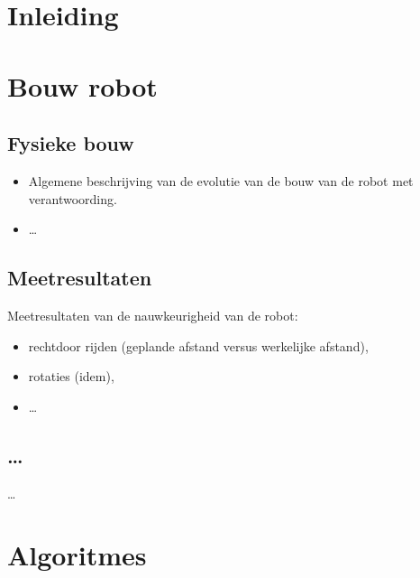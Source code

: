 \documentclass[tt1]{penoverslag}
\begin{document}

\maketitlepage

\begin{abstract}
\lipsum[1-2]
\end{abstract}

\tableofcontents

\newpage

\section{Inleiding}
\lipsum[1-2]

\section{Bouw robot}
\lipsum[3]

\subsection{Fysieke bouw}
\begin{itemize}
\item Algemene beschrijving van de evolutie van de bouw van de robot met verantwoording.
\item \ldots
\end{itemize}

\subsection{Meetresultaten}
Meetresultaten van de nauwkeurigheid van de robot:
\begin{itemize}
\item rechtdoor rijden (geplande afstand versus werkelijke afstand),
\item rotaties (idem),
\item \ldots
\end{itemize}

\subsection{\ldots}
\ldots


\section{Algoritmes}
\lipsum[4]
\end{document}
